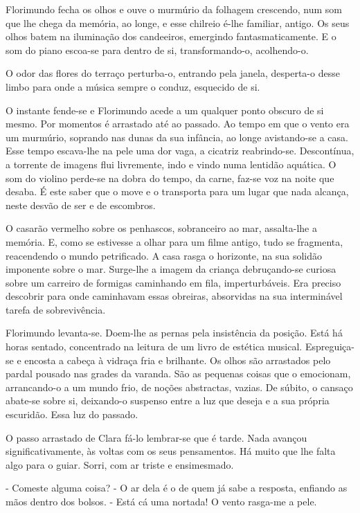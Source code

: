 Florimundo fecha os olhos e ouve o murmúrio da folhagem crescendo, num
som que lhe chega da memória, ao longe, e esse chilreio é-lhe familiar,
antigo. Os seus olhos batem na iluminação dos candeeiros, emergindo
fantasmaticamente. E o som do piano escoa-se para dentro de si,
transformando-o, acolhendo-o.

O odor das flores do terraço perturba-o, entrando pela janela,
desperta-o desse limbo para onde a música sempre o conduz, esquecido de
si.

O instante fende-se e Florimundo acede a um qualquer ponto obscuro de si
mesmo. Por momentos é arrastado até ao passado. Ao tempo em que o vento
era um murmúrio, soprando nas dunas da sua infância, ao longe
avistando-se a casa. Esse tempo escava-lhe na pele uma dor vaga, a
cicatriz reabrindo-se. Descontínua, a torrente de imagens flui
livremente, indo e vindo numa lentidão aquática. O som do violino
perde-se na dobra do tempo, da carne, faz-se voz na noite que desaba. É
este saber que o move e o transporta para um lugar que nada alcança,
neste desvão de ser e de escombros.

O casarão vermelho sobre os penhascos, sobranceiro ao mar, assalta-lhe a
memória. E, como se estivesse a olhar para um filme antigo, tudo se
fragmenta, reacendendo o mundo petrificado. A casa rasga o horizonte, na
sua solidão imponente sobre o mar. Surge-lhe a imagem da criança
debruçando-se curiosa sobre um carreiro de formigas caminhando em fila,
imperturbáveis. Era preciso descobrir para onde caminhavam essas
obreiras, absorvidas na sua interminável tarefa de sobrevivência.

Florimundo levanta-se. Doem-lhe as pernas pela insistência da posição.
Está há horas sentado, concentrado na leitura de um livro de estética
musical. Espreguiça-se e encosta a cabeça à vidraça fria e brilhante. Os
olhos são arrastados pelo pardal pousado nas grades da varanda. São as
pequenas coisas que o emocionam, arrancando-o a um mundo frio, de noções
abstractas, vazias. De súbito, o cansaço abate-se sobre si, deixando-o
suspenso entre a luz que deseja e a sua própria escuridão. Essa luz do
passado.

O passo arrastado de Clara fá-lo lembrar-se que é tarde. Nada avançou
significativamente, às voltas com os seus pensamentos. Há muito que lhe
falta algo para o guiar. Sorri, com ar triste e ensimesmado.

- Comeste alguma coisa? - O ar dela é o de quem já sabe a resposta,
enfiando as mãos dentro dos bolsos. - Está cá uma nortada! O vento
rasga-me a pele.


